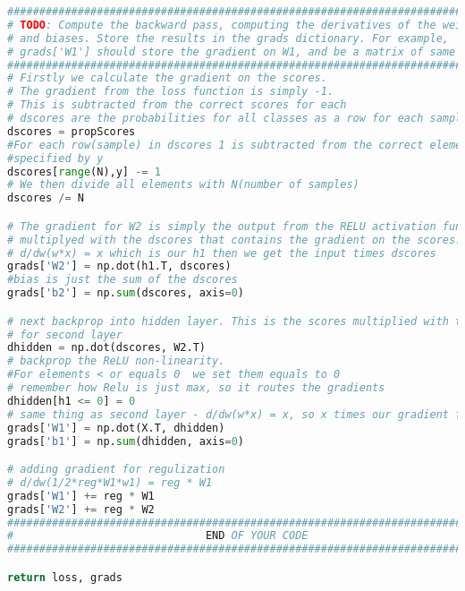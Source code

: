 \begin{lstlisting}[language=Python, label=lst:neuralnet.py, caption={neural\_net.py}, basicstyle=\tiny]
#############################################################################
# TODO: Compute the backward pass, computing the derivatives of the weights #
# and biases. Store the results in the grads dictionary. For example,       #
# grads['W1'] should store the gradient on W1, and be a matrix of same size #
#############################################################################
# Firstly we calculate the gradient on the scores.
# The gradient from the loss function is simply -1.
# This is subtracted from the correct scores for each
# dscores are the probabilities for all classes as a row for each sample
dscores = propScores
#For each row(sample) in dscores 1 is subtracted from the correct element 
#specified by y
dscores[range(N),y] -= 1
# We then divide all elements with N(number of samples)
dscores /= N

# The gradient for W2 is simply the output from the RELU activation function (h1)
# multiplyed with the dscores that contains the gradient on the scores.
# d/dw(w*x) = x which is our h1 then we get the input times dscores
grads['W2'] = np.dot(h1.T, dscores)
#bias is just the sum of the dscores
grads['b2'] = np.sum(dscores, axis=0)

# next backprop into hidden layer. This is the scores multiplied with the weights
# for second layer
dhidden = np.dot(dscores, W2.T)
# backprop the ReLU non-linearity. 
#For elements < or equals 0  we set them equals to 0
# remember how Relu is just max, so it routes the gradients
dhidden[h1 <= 0] = 0
# same thing as second layer - d/dw(w*x) = x, so x times our gradient for dhidden
grads['W1'] = np.dot(X.T, dhidden)
grads['b1'] = np.sum(dhidden, axis=0)

# adding gradient for regulization
# d/dw(1/2*reg*W1*w1) = reg * W1
grads['W1'] += reg * W1 
grads['W2'] += reg * W2
#############################################################################
#                              END OF YOUR CODE                             #
#############################################################################

return loss, grads
\end{lstlisting}










